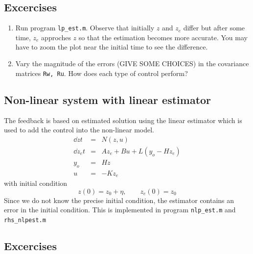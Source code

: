 \documentclass[12pt]{article}
\begin{document}
\subsection{Excercises}

\begin{enumerate}

\item Run program {\tt lp\_est.m}. Observe that initially $z$ and $z_e$ differ but after some time, $z_e$ approches $z$ so that the estimation becomes more accurate. You may have to zoom the plot near the initial time to see the difference.

\item Vary the magnitude of the errors (GIVE SOME CHOICES) in the covariance matrices {\tt Rw, Ru}. How does each type of control perform?
\end{enumerate}


\subsection{Non-linear system with linear estimator}

The feedback is based on estimated solution using the linear estimator which is used to add the control into the non-linear model.
\begin{eqnarray*}
\dd{z}{t} &=& N(z, u) \\
\dd{z_e}{t} &=& A z_e + B u + L(y_o - H z_e) \\
y_o &=& H z \\
u &=& -K z_e
\end{eqnarray*}
with initial condition
\[
z(0) = z_0 + \eta, \qquad z_e(0) = z_0
\]
Since we do not know the precise initial condition, the estimator contains an error in the initial condition. This is implemented in program {\tt nlp\_est.m} and {\tt rhs\_nlpest.m}
\subsection{Excercises}
\end{document}
